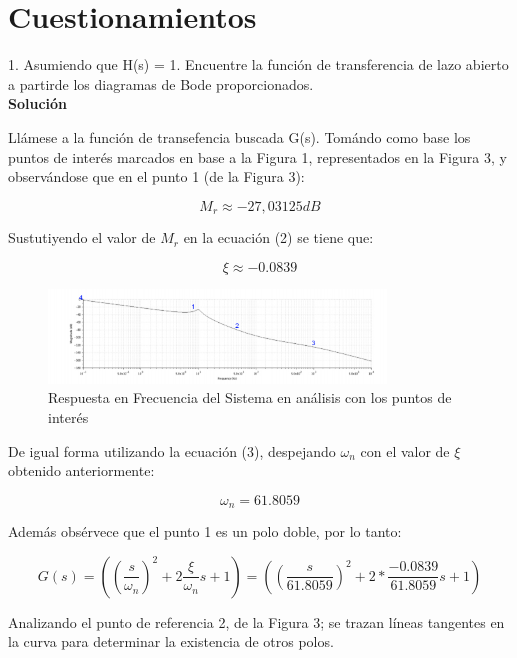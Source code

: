 \documentclass[12pt,letterpaper]{article}
\begin{document}
\section{Cuestionamientos}
1. Asumiendo que H(s) = 1. Encuentre la función de transferencia de lazo abierto a partirde los diagramas de Bode proporcionados.\\

\textbf{Solución}

Llámese a la función de transefencia buscada G(s). Tomándo como base los puntos de interés marcados en base a la Figura 1, representados en la Figura 3, y observándose que en el punto 1 (de la Figura 3):

\begin{equation*}
    M_r \approx -27,03125 dB
\end{equation*}


Sustutiyendo el valor de $M_r$ en la ecuación (2) se tiene que:

\begin{equation*}
    \xi \approx -0.0839
\end{equation*}

\begin{figure}
  \centering
    \includegraphics[width=0.8\textwidth]{diag3.jpg}
  \caption{Respuesta en Frecuencia del Sistema en análisis con los puntos de interés}
  \label{fig:ejemplo}
\end{figure}


De igual forma utilizando la ecuación (3), despejando $\omega_n$ con el valor de $\xi$ obtenido anteriormente:

\begin{equation*}
    \omega_n = 61.8059
\end{equation*}


Además obsérvece que el punto 1 es un polo doble, por lo tanto:

\begin{equation}
    G(s)= ((\frac{s}{\omega_n})^2 + 2\frac{\xi}{\omega_n}s +1) = ((\frac{s}{61.8059})^2 +2*\frac{-0.0839}{61.8059}s + 1)
\end{equation}

Analizando el punto de referencia 2, de la Figura 3; se trazan líneas tangentes en la curva para determinar la existencia de otros polos.
\end{document}
